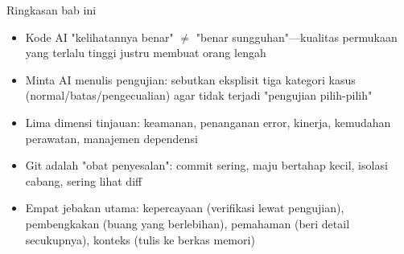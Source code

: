 \begin{tcbsummary}{Ringkasan bab ini}
\begin{itemize}
  \item Kode AI "kelihatannya benar" $\neq$ "benar sungguhan"—kualitas permukaan yang terlalu tinggi justru membuat orang lengah
  \item Minta AI menulis pengujian: sebutkan eksplisit tiga kategori kasus (normal/batas/pengecualian) agar tidak terjadi "pengujian pilih-pilih"
  \item Lima dimensi tinjauan: keamanan, penanganan error, kinerja, kemudahan perawatan, manajemen dependensi
  \item Git adalah "obat penyesalan": commit sering, maju bertahap kecil, isolasi cabang, sering lihat diff
  \item Empat jebakan utama: kepercayaan (verifikasi lewat pengujian), pembengkakan (buang yang berlebihan), pemahaman (beri detail secukupnya), konteks (tulis ke berkas memori)
\end{itemize}

\end{tcbsummary}
